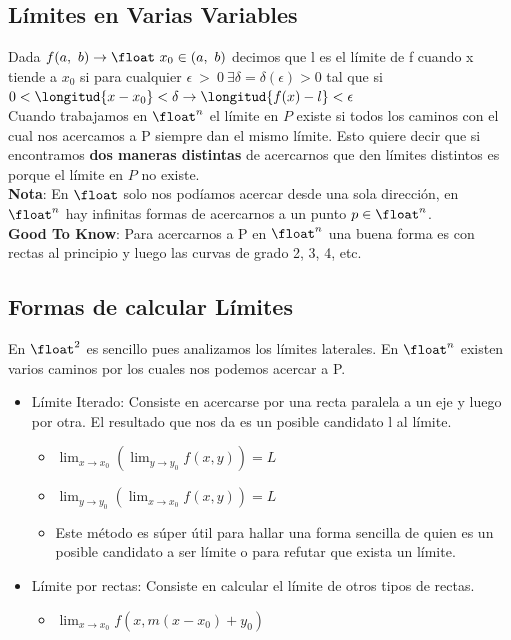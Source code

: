 \documentclass[10pt,a4paper]{article}
\begin{document}
\subsection*{Límites en Varias Variables}
Dada $f(a, \ b) \rightarrow \float \ x_{0} \in (a,\ b)$ decimos que l es el límite de f cuando x tiende a $x_{0}$ si para cualquier $\epsilon \ > \ 0 \ \exists \delta = \delta(\epsilon) > 0$ tal que si $ 0 < \longitud{x-x_{0}} < \delta \rightarrow \longitud{f(x) - l} < \epsilon$  \\
Cuando trabajamos en $\float^{n}$ el límite en $P$ existe si todos los caminos con el cual nos acercamos a P siempre dan el mismo límite. Esto quiere decir que si encontramos \textbf{dos maneras distintas} de acercarnos que den límites distintos es porque el límite en $P$ no existe. \\
\textbf{Nota}: En $\float$ solo nos podíamos acercar desde una sola dirección, en $\float^{n}$ hay infinitas formas de acercarnos a un punto $p \in \float^{n}$. \\
\textbf{Good To Know}: Para acercarnos a P en $\float^{n}$ una buena forma es con rectas al principio y luego las curvas de grado 2, 3, 4, etc. 
\subsection*{Formas de calcular Límites}
En $\float^{2}$ es sencillo pues analizamos los límites laterales. En $\float^{n}$ existen varios caminos por los cuales nos podemos acercar a P.
\begin{itemize}
    \item Límite Iterado: Consiste en acercarse por una recta paralela a un eje y luego por otra. El resultado que nos da es un posible candidato l al límite.
    \begin{itemize}
        \item $\lim_{x \to x_0} \left( \lim_{y \to y_0} f(x, y) \right) = L$
        \item $\lim_{y \to y_0} \left( \lim_{x \to x_0} f(x, y) \right) = L$
        \item Este método es súper útil para hallar una forma sencilla de quien es un posible candidato a ser límite o para refutar que exista un límite.
    \end{itemize}
    \item Límite por rectas: Consiste en calcular el límite de otros tipos de rectas. 
    \begin{itemize}
        \item $\lim_{x \to x_0} f(x, m(x-x_{0}) + y_{0})$
    \end{itemize}

\end{itemize}
\end{document}
